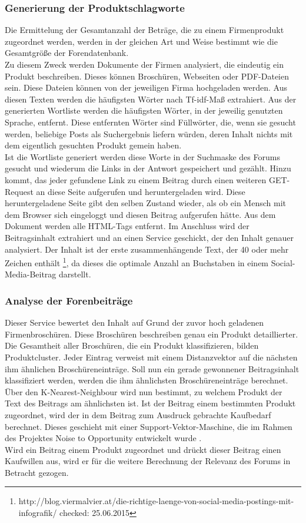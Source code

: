 \subsubsection{Generierung der Produktschlagworte}
Die Ermittelung der Gesamtanzahl der Beträge, die zu einem Firmenprodukt zugeordnet werden, werden in der gleichen Art und Weise bestimmt wie die Gesamtgröße der Forendatenbank.\\
Zu diesem Zweck werden Dokumente der Firmen analysiert, die eindeutig ein Produkt beschreiben. Dieses können Broschüren, Webseiten oder PDF-Dateien sein. Diese Dateien können von der jeweiligen Firma hochgeladen werden. Aus diesen Texten werden die häufigsten Wörter nach Tf-idf-Maß extrahiert. Aus der generierten Wortliste werden die häufigsten Wörter, in der jeweilig genutzten Sprache, entfernt. Diese entfernten Wörter sind Füllwörter, die, wenn sie gesucht werden, beliebige Posts als Suchergebnis liefern würden, deren Inhalt nichts mit dem eigentlich gesuchten Produkt gemein haben.\\
Ist die Wortliste generiert werden diese Worte in der Suchmaske des Forums gesucht und wiederum die Links in der Antwort gespeichert und gezählt. Hinzu kommt, das jeder gefundene Link zu einem Beitrag durch einen weiteren GET-Request an diese Seite aufgerufen und heruntergeladen wird. Diese heruntergeladene Seite gibt den selben Zustand wieder, als ob ein Mensch mit dem Browser sich eingeloggt und diesen Beitrag aufgerufen hätte. Aus dem Dokument werden alle HTML-Tags entfernt. Im Anschluss wird der Beitragsinhalt extrahiert und an einen Service geschickt, der den Inhalt genauer analysiert. Der Inhalt ist der erste zusammenhängende Text, der 40 oder mehr Zeichen enthält \footnote{http://blog.viermalvier.at/die-richtige-laenge-von-social-media-postings-mit-infografik/ checked: 25.06.2015}, da dieses die optimale Anzahl an Buchstaben in einem Social- Media-Beitrag darstellt.

\subsubsection{Analyse der Forenbeiträge}
Dieser Service bewertet den Inhalt auf Grund der zuvor hoch geladenen Firmenbroschüren. Diese Broschüren beschreiben genau ein Produkt detaillierter. Die Gesamtheit aller Broschüren, die ein Produkt klassifizieren, bilden Produktcluster. Jeder Eintrag verweist mit einem Distanzvektor auf die nächsten ihm ähnlichen Broschüreneinträge. Soll nun ein gerade gewonnener Beitragsinhalt klassifiziert werden, werden die ihm ähnlichsten Broschüreneinträge berechnet. Über den K-Nearest-Neighbour wird nun bestimmt, zu welchem Produkt der Text des Beitrags am ähnlichsten ist. Ist der Beitrag einem bestimmten Produkt zugeordnet, wird der in dem Beitrag zum Ausdruck gebrachte Kaufbedarf berechnet. Dieses geschieht mit einer Support-Vektor-Maschine, die im Rahmen des Projektes Noise to Opportunity entwickelt wurde \cite{n2o}.\\
Wird ein Beitrag einem Produkt zugeordnet und drückt dieser Beitrag einen Kaufwillen aus, wird er für die weitere Berechnung der Relevanz des Forums in Betracht gezogen.

